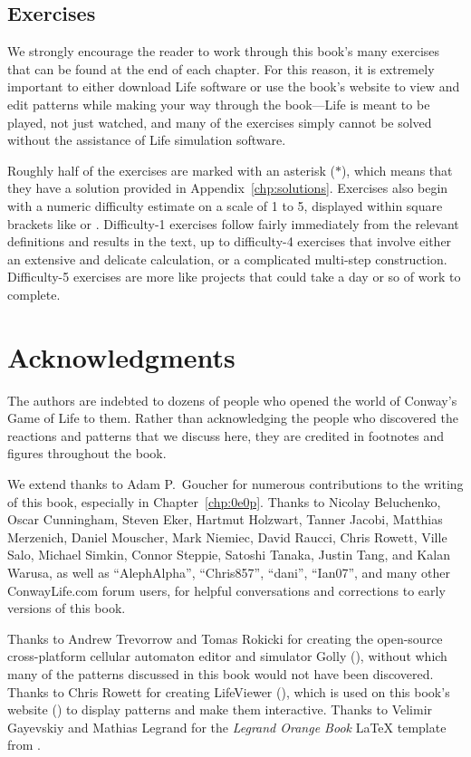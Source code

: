 \subsection*{Exercises}

We strongly encourage the reader to work through this book's many exercises that can be found at the end of each chapter. For this reason, it is extremely important to either download Life software or use the book's website to view and edit patterns while making your way through the book---Life is meant to be played, not just watched, and many of the exercises simply cannot be solved without the assistance of Life simulation software.

Roughly half of the exercises are marked with an asterisk ($\ast$), which means that they have a solution provided in Appendix~\ref{chp:solutions}. Exercises also begin with a numeric difficulty estimate on a scale of 1 to 5, displayed within square brackets like  or . Difficulty-1 exercises follow fairly immediately from the relevant definitions and results in the text, up to difficulty-4 exercises that involve either an extensive and delicate calculation, or a complicated multi-step construction. Difficulty-5 exercises are more like projects that could take a day or so of work to complete.


\section*{Acknowledgments}

The authors are indebted to dozens of people who opened the world of Conway's Game of Life to them. Rather than acknowledging the people who discovered the reactions and patterns that we discuss here, they are credited in footnotes and figures throughout the book.

We extend thanks to Adam P.~Goucher for numerous contributions to the writing of this book, especially in Chapter~\ref{chp:0e0p}. Thanks to Nicolay Beluchenko, Oscar Cunningham, Steven Eker, Hartmut Holzwart, Tanner Jacobi, Matthias Merzenich, Daniel Mouscher, Mark Niemiec, David Raucci, Chris Rowett, Ville Salo, Michael Simkin, Connor Steppie, Satoshi Tanaka, Justin Tang, and Kalan Warusa, as well as ``AlephAlpha'', ``Chris857'', ``dani'', ``Ian07'', and many other ConwayLife.com forum users, for helpful conversations and corrections to early versions of this book.

Thanks to Andrew Trevorrow and Tomas Rokicki for creating the open-source cross-platform cellular automaton editor and simulator Golly (), without which many of the patterns discussed in this book would not have been discovered. Thanks to Chris Rowett for creating LifeViewer (), which is used on this book's website () to display patterns and make them interactive. Thanks to Velimir Gayevskiy and Mathias Legrand for the \emph{Legrand Orange Book} LaTeX template from .

